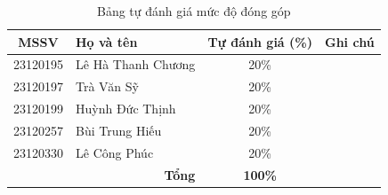 \vspace{1em}
\begin{table}[H]
\centering
\renewcommand{\arraystretch}{1.4}
\caption{Bảng tự đánh giá mức độ đóng góp}
\label{tab:danh-gia-dong-gop}
\begin{tabular}{@{} c p{3.8cm} c c @{}}
\toprule
\textbf{MSSV} & \textbf{Họ và tên} & \textbf{Tự đánh giá (\%)} & \textbf{Ghi chú} \\
\midrule
23120195 & Lê Hà Thanh Chương & 20\% & \\
23120197 & Trà Văn Sỹ         & 20\% & \\
23120199 & Huỳnh Đức Thịnh    & 20\% & \\
23120257 & Bùi Trung Hiếu     & 20\% & \\
23120330 & Lê Công Phúc       & 20\% & \\
\midrule
\multicolumn{2}{r}{\textbf{Tổng}} & \textbf{100\%} & \\
\bottomrule
\end{tabular}
\end{table}

\clearpage